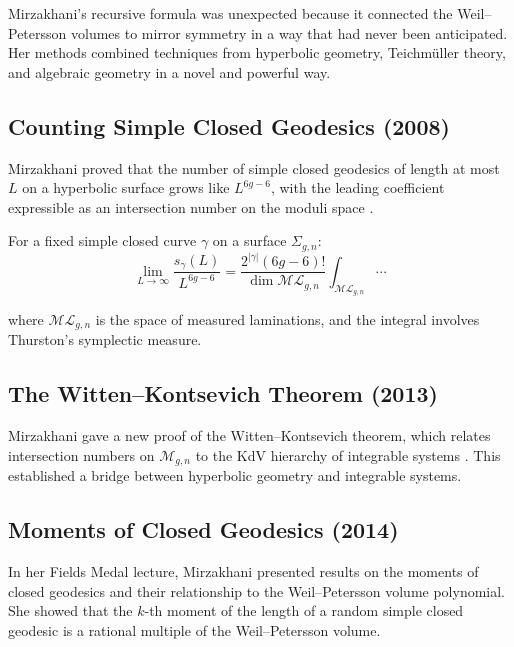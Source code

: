\begin{highlightbox}
Mirzakhani's recursive formula was unexpected because it connected the Weil--Petersson volumes to mirror symmetry in a way that had never been anticipated. Her methods combined techniques from hyperbolic geometry, Teichm\"uller theory, and algebraic geometry in a novel and powerful way.
\end{highlightbox}

\subsection{Counting Simple Closed Geodesics (2008)}

Mirzakhani proved that the number of simple closed geodesics of length at most $L$ on a hyperbolic surface grows like $L^{6g-6}$, with the leading coefficient expressible as an intersection number on the moduli space \cite{mirzakhani2008}.

For a fixed simple closed curve $\gamma$ on a surface $\Sigma_{g,n}$:
\begin{equation}
\lim_{L \to \infty} \frac{s_\gamma(L)}{L^{6g-6}} = \frac{2^{|\gamma|} (6g-6)!}{\dim \mathcal{ML}_{g,n}} \int_{\mathcal{ML}_{g,n}} \cdots
\end{equation}

where $\mathcal{ML}_{g,n}$ is the space of measured laminations, and the integral involves Thurston's symplectic measure.

\subsection{The Witten--Kontsevich Theorem (2013)}

Mirzakhani gave a new proof of the Witten--Kontsevich theorem, which relates intersection numbers on $\mathcal{M}_{g,n}$ to the KdV hierarchy of integrable systems \cite{mirzakhani2013}. This established a bridge between hyperbolic geometry and integrable systems.

\subsection{Moments of Closed Geodesics (2014)}

In her Fields Medal lecture, Mirzakhani presented results on the moments of closed geodesics and their relationship to the Weil--Petersson volume polynomial. She showed that the $k$-th moment of the length of a random simple closed geodesic is a rational multiple of the Weil--Petersson volume.

